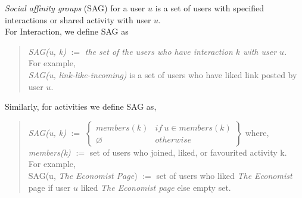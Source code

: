 {\em Social affinity groups} (SAG) for a user $u$ is a set of users with specified interactions or shared activity with user $u$.\\
For Interaction, we define SAG as
\begin{quote}
	\textit{SAG(u, k)} $:=$ \textit{the set of the users who have interaction $k$ with user $u$}.\\
   For example,\\
   \textit{SAG(u, link-like-incoming)}  is a set of users who have liked link posted by user $u$.
\end{quote}
Similarly, for activities we define SAG as,
\begin{quote}
\textit{SAG(u, k)} $:=$
							\begin{math} 
							\begin{Bmatrix}
								members(k) & if\ u \in members(k)\\ 	
								\varnothing & otherwise
							\end{Bmatrix}
							\end{math}
	where, 	\textit{members(k)} $:=$ set of users who joined, liked, or favourited activity k.\\
	For example,\\
	SAG(u, \textit{The Economist Page}) $:=$ set of users who liked \textit{The Economist} page if user $u$ liked \textit{The Economist page} else empty set.
\end{quote}	


